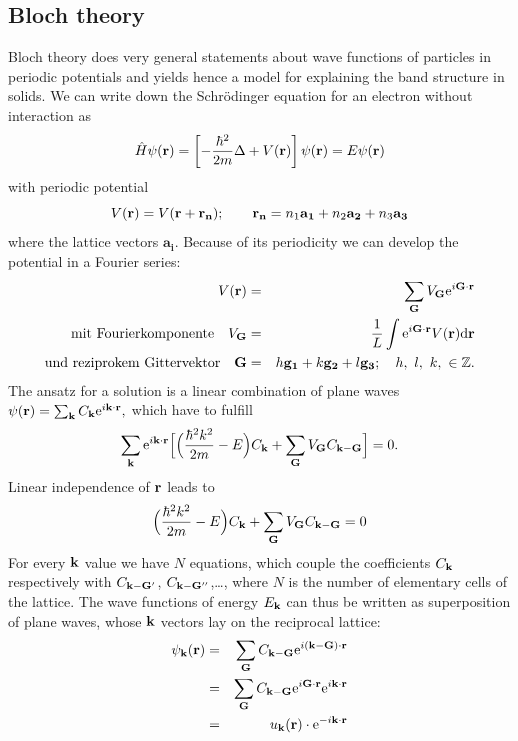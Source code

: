 \subsection{Bloch theory}
Bloch theory does very general statements about wave functions of particles in periodic potentials and
yields hence a model for explaining the band structure in solids.
We can write down the Schrödinger equation for an electron without interaction as 
\begin{equation}
    \hat{ H} \psi(\mathbf{r}) = \left [ - \frac{\hbar^2}{2m} \Delta + V(\mathbf{r}) \right] \psi(\mathbf{r}) = E \psi(\mathbf{r})
\end{equation}
with periodic potential
\begin{equation}
    V(\mathbf{r}) = V(\mathbf{r + r_n}); 
\qquad \mathbf{r_n} = n_1 \mathbf{a_1} + n_2 \mathbf{a_2} + n_3 \mathbf{a_3} 
\end{equation}
where the lattice vectors $\mathbf{a_i}$. Because of its periodicity we can develop the
potential in a Fourier series:
\begin{eqnarray}
    V(\mathbf{r}) &= &\sum_{\mathbf{G}} V_{\mathbf{G}} \mathrm{e}^{i\mathbf{G} \cdot \mathbf{r}} \\
    \mathrm{mit \ Fourierkomponente \quad}  V_{\mathbf{G}} &= &\frac{1}{L} \int \mathrm{e}^{i\mathbf{G} \cdot \mathbf{r}} 
    V(\mathbf{r}) \mathrm{d}\mathbf{r}  \nonumber \\
    \mathrm{und \ reziprokem \ Gittervektor \quad} \mathbf{G} &= &h\mathbf{g_1} + k\mathbf{g_2} +l\mathbf{g_3}; 
    \quad h, \ l, \ k, \ \in \mathbb{Z}. \nonumber
\end{eqnarray}
The ansatz for a solution is a linear combination of plane waves
$ \psi(\mathbf{r}) = \sum_{\mathbf{k}} C_{\mathbf{k}} \mathrm{e}^{i\mathbf{k} \cdot \mathbf{r}}, $
which have to fulfill
\begin{equation}
    \sum_{\mathbf{k}} \mathrm{e}^{i\mathbf{k} \cdot \mathbf{r}} 
    \Big[ \Big( \frac{\hbar^2 k^2}{2m} - E\Big) C_{\mathbf{k}} + \sum_{\mathbf{G}} V_{\mathbf{G}} C_{\mathbf{k} - \mathbf{G}}\Big] 
    = 0.
\end{equation}
Linear independence of $\mathbf{r}$ leads to
\begin{equation}
    \Big( \frac{\hbar^2 k^2}{2m} - E\Big) C_{\mathbf{k}} + \sum_{\mathbf{G}} V_{\mathbf{G}} C_{\mathbf{k} - \mathbf{G}}= 0
\end{equation}
For every $\mathbf{k}$ value we have $N$ equations, which couple the coefficients $C_{\mathbf{k}}$ respectively with 
$C_{\mathbf{k} - \mathbf{G}'}$, $C_{\mathbf{k} - \mathbf{G}''}$,\ldots, where $N$ is the number of elementary cells of the lattice.
The wave functions of energy  $E_{\mathbf{k}}$ can thus be written as superposition of plane waves, whose 
$\mathbf{k}$ vectors lay on the reciprocal lattice:
\begin{eqnarray}
    \psi_{\mathbf{k}}(\mathbf{r})&=& \sum_{\mathbf{G}} C_{\mathbf{k} - \mathbf{G}} \mathrm{e}^{i(\mathbf{k} - \mathbf{G}) \cdot \mathbf{r}} \nonumber \\
            &=& \sum_{\mathbf{G}} C_{\mathbf{k} - \mathbf{G}} \mathrm{e}^{i \mathbf{G} \cdot \mathbf{r}}  \mathrm{e}^{i\mathbf{k} \cdot \mathbf{r}} \nonumber \\
            &=& u_{\mathbf{k}}(\mathbf{r}) \cdot \mathrm{e}^{-i\mathbf{k} \cdot \mathbf{r}} 
\end{eqnarray}
